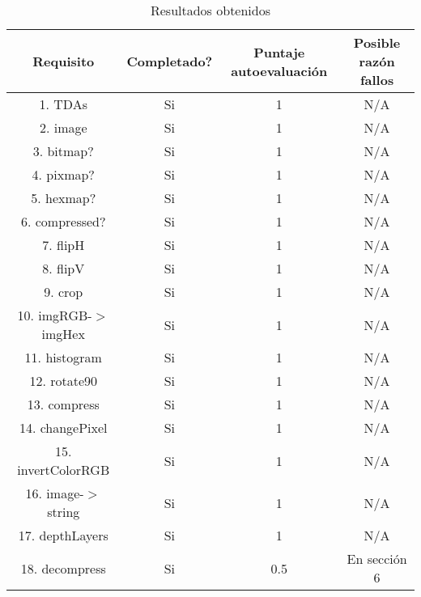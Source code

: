 \begin{table}[H]
    \begin{center}
    \begin{tabular}{| c | c | c | c |}
    \hline
    Requisito & Completado? & Puntaje autoevaluación & Posible razón fallos \\ \hline \hline
    1. TDAs & Si & 1 & N/A \\ \hline
    2. image & Si & 1 & N/A \\ \hline
    3. bitmap? & Si & 1 & N/A \\ \hline
    4. pixmap? & Si & 1 & N/A \\ \hline
    5. hexmap? & Si & 1 & N/A \\ \hline
    6. compressed? & Si & 1 & N/A \\ \hline
    7. flipH & Si & 1 & N/A \\ \hline
    8. flipV & Si & 1 & N/A \\ \hline
    9. crop & Si & 1 & N/A \\ \hline
    10. imgRGB-$>$imgHex & Si & 1 & N/A \\ \hline
    11. histogram & Si & 1 & N/A \\ \hline
    12. rotate90 & Si & 1 & N/A \\ \hline
    13. compress & Si & 1 & N/A \\ \hline
    14. changePixel & Si & 1 & N/A \\ \hline
    15. invertColorRGB & Si & 1 & N/A \\ \hline
    16. image-$>$string & Si & 1 & N/A \\ \hline
    17. depthLayers & Si & 1 & N/A \\  \hline
    18. decompress & Si & 0.5 & En sección 6 \\ \hline
    \end{tabular}
    \caption{Resultados obtenidos}
    \label{tab:Resultados}
    \end{center}
\end{table}